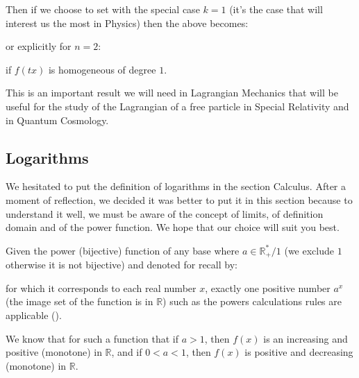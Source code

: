	Then if we choose to set with the special case $k=1$ (it's the case that will interest us the most in Physics) then the above becomes:
	
	or explicitly for $n=2$:
	
	if $f(tx)$ is homogeneous of degree $1$.
	
	This is an important result we will need in Lagrangian Mechanics that will be useful for the study of the Lagrangian of a free particle in Special Relativity and in Quantum Cosmology.
	
	
			
	\pagebreak
	\subsection{Logarithms}\label{logarithms}
	We hesitated to put the definition of logarithms in the section Calculus. After a moment of reflection, we decided it was better to put it in this section because to understand it well, we must be aware of the concept of limits, of definition domain and of the power function. We hope that our choice will suit you best.
	
	Given the power (bijective) function of any base where $a \in \mathbb{R}_{+}^{*}/1$ (we exclude $1$ otherwise it is not bijective) and denoted for recall by:
	
	for which it corresponds to each real number $x$, exactly one positive number $a^x$ (the image set of the function is in $\mathbb{R}$) such as the powers calculations rules are applicable ().
	
	We know that for such a function that if $a>1$, then $f (x)$ is an increasing and positive (monotone) in $\mathbb{R}$, and if $0<a<1$, then $f(x)$ is positive and decreasing (monotone) in $\mathbb{R}$.
	
